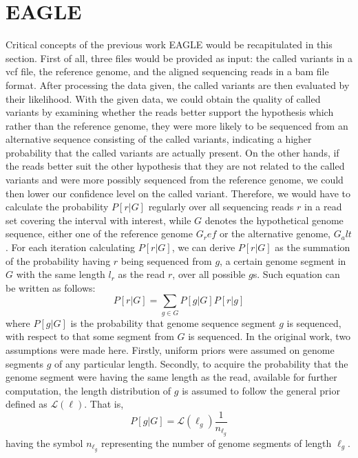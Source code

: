 \documentclass{PHlab-thesis}
\begin{document}
\section{EAGLE}
Critical concepts of the previous work EAGLE would be recapitulated in this section. First of all, three files would be provided as input: the called variants in a vcf file, the reference genome, and the aligned sequencing reads in a bam file format. After processing the data given, the called variants are then evaluated by their likelihood. With the given data, we could obtain the quality of called variants by examining whether the reads better support the hypothesis which rather than the reference genome, they were more likely to be sequenced from an alternative sequence consisting of the called variants, indicating a higher probability that the called variants are actually present. On the other hands, if the reads better suit the other hypothesis that they are not related to the called variants and were more possibly sequenced from the reference genome, we could then lower our confidence level on the called variant. Therefore, we would have to calculate the probability $P[r|G]$ regularly over all sequencing reads $r$ in a read set covering the interval with interest, while $G$ denotes the hypothetical genome sequence, either one of the reference genome $G_ref$ or the alternative genome, $G_alt$. For each iteration calculating $P[r|G]$, we can derive $P[r|G]$ as the summation of the probability having $r$ being sequenced from $g$, a certain genome segment in $G$ with the same length $l_r$ as the read $r$, over all possible $g$s. Such equation can be written as follows:
\begin{equation*}
P[r|G] = \sum_{g\in G} P[g|G] P[r|g]
\end{equation*}
where $P[g|G]$ is the probability that genome sequence segment $g$ is sequenced, with respect to that some segment from $G$ is sequenced. In the original work, two assumptions were made here. Firstly, uniform priors were assumed on genome segments $g$ of any particular length. Secondly, to acquire the probability that the genome segment were having the same length as the read, available for further computation, the length distribution of $g$ is assumed to follow the general prior defined as $\mathcal{L}(\ell)$. That is,
\begin{equation*}
P[g|G] = \mathcal{L}(\ell_g) \frac{1}{n_{\ell_g}}
\end{equation*}
having the symbol $n_{\ell_g}$ representing the number of genome segments of length $\ell_g$.
\end{document}
